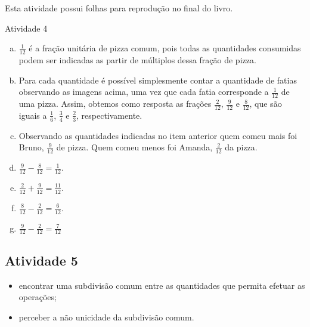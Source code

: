 \begin{multicols}{2}
\begin{itemize}
Esta atividade possui folhas para reprodução no final do livro.
\end{itemize} %

\begin{resposta*}{Atividade 4}
  \begin{enumerate}[a)]
   \item $\frac{1}{12}$ é a fração unitária de pizza comum, pois todas as quantidades consumidas podem ser indicadas as partir de múltiplos dessa fração de pizza.
   \item Para cada quantidade é possível simplesmente contar a quantidade de fatias observando as imagens acima, uma vez que cada fatia corresponde a $\frac{1}{12}$ de uma pizza. Assim, obtemos como resposta as frações $\frac{2}{12}$, $\frac{9}{12}$ e $\frac{8}{12}$, que são iguais a $\frac{1}{6}$, $\frac{3}{4}$ e $\frac{2}{3}$, respectivamente.
   \item  Observando as quantidades indicadas no item anterior quem comeu mais foi Bruno, $\frac{9}{12}$ de pizza. Quem comeu menos foi Amanda, $\frac{2}{12}$ da pizza.
   \item  $\frac{9}{12} -  \frac{8}{12} = \frac{1}{12}$.
   \item  $\frac{2}{12} +  \frac{9}{12} = \frac{11}{12}$.
   \item  $\frac{8}{12} -  \frac{2}{12} = \frac{6}{12}$.
   \item  $\frac{9}{12} -  \frac{2}{12} = \frac{7}{12}$
  \end{enumerate}

\end{resposta*}



\subsection{Atividade 5}

  \newline \vspace{.15cm}

  \begin{itemize} %
    \item       encontrar uma subdivisão comum entre as quantidades que permita efetuar as operações;
    \item       perceber a não unicidade da subdivisão comum.
\end{itemize} %

   \vspace{.15cm}


\end{multicols}
